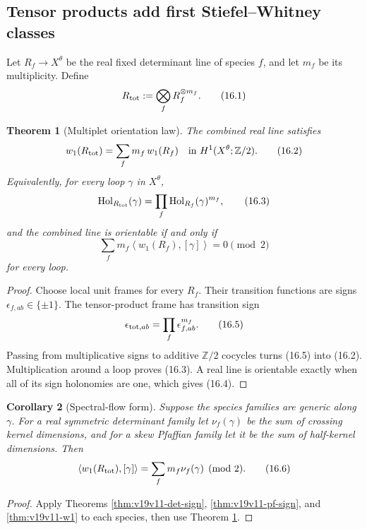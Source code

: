 \documentclass[11pt]{article}
\newtheorem{theorem}{Theorem}[section]
\newtheorem{corollary}[theorem]{Corollary}
\theoremstyle{remark}
\begin{document}
\subsection{Tensor products add first Stiefel--Whitney classes}

Let \(R_f\to X^\theta\) be the real fixed determinant line of species
\(f\), and let \(m_f\) be its multiplicity.  Define
\[
 R_{\rm tot}:=\bigotimes_f R_f^{\otimes m_f}.                  \tag{16.1}
\]

\begin{theorem}[Multiplet orientation law]
\label{thm:v19v13-w1-sum}
The combined real line satisfies
\[
 w_1(R_{\rm tot})
 =\sum_f m_f\,w_1(R_f)
 \quad\hbox{in }H^1(X^\theta;\mathbb Z/2).                    \tag{16.2}
\]
Equivalently, for every loop \(\gamma\) in \(X^\theta\),
\[
 {\rm Hol}_{R_{\rm tot}}(\gamma)
 =\prod_f{\rm Hol}_{R_f}(\gamma)^{m_f},                        \tag{16.3}
\]
and the combined line is orientable if and only if
\[
 \sum_fm_f
 \left\langle w_1(R_f),[\gamma]\right\rangle=0\pmod2          \tag{16.4}
\]
for every loop.
\end{theorem}

\begin{proof}
Choose local unit frames for every \(R_f\).  Their transition functions
are signs \(\epsilon_{f,ab}\in\{\pm1\}\).  The tensor-product frame has
transition sign
\[
 \epsilon_{{\rm tot},ab}
 =\prod_f\epsilon_{f,ab}^{m_f}.                               \tag{16.5}
\]
Passing from multiplicative signs to additive \(\mathbb Z/2\) cocycles
turns (16.5) into (16.2).  Multiplication around a loop proves (16.3).
A real line is orientable exactly when all of its sign holonomies are one,
which gives (16.4).
\end{proof}

\begin{corollary}[Spectral-flow form]
\label{cor:v19v13-flow-sum}
Suppose the species families are generic along \(\gamma\).  For a real
symmetric determinant family let \(\nu_f(\gamma)\) be the sum of crossing
kernel dimensions, and for a skew Pfaffian family let it be the sum of
half-kernel dimensions.  Then
\[
 \left\langle w_1(R_{\rm tot}),[\gamma]\right\rangle
 =\sum_fm_f\nu_f(\gamma)\pmod2.                               \tag{16.6}
\]
\end{corollary}

\begin{proof}
Apply Theorems \ref{thm:v19v11-det-sign},
\ref{thm:v19v11-pf-sign}, and \ref{thm:v19v11-w1} to each species, then
use Theorem \ref{thm:v19v13-w1-sum}.
\end{proof}
\end{document}
